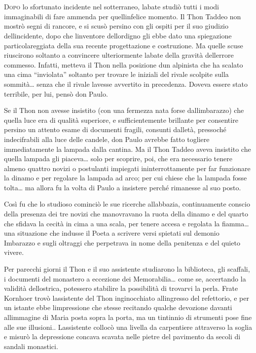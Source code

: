 	\chapter{\phantom{title}}

\lettrine{D}{opo} lo sfortunato incidente nel sotterraneo, l\textquotesingle abate
studiò tutti i modi immaginabili di fare ammenda per
quell\textquotesingle infelice momento. Il Thon Taddeo non mostrò segni
di rancore, e si scusò persino con gli ospiti per il suo giudizio
dell\textquotesingle incidente, dopo che l\textquotesingle inventore
dell\textquotesingle ordigno gli ebbe dato una spiegazione
particolareggiata della sua recente progettazione e costruzione. Ma
quelle scuse riuscirono soltanto a convincere ulteriormente
l\textquotesingle abate della gravità dell\textquotesingle errore
commesso. Infatti, metteva il Thon nella posizione d\textquotesingle un
alpinista che ha scalato una cima ``inviolata'' soltanto per trovare le
iniziali del rivale scolpite sulla sommità\ldots{} senza che il rivale
l\textquotesingle avesse avvertito in precedenza. Doveva essere stato
terribile, per lui, pensò don Paulo.

Se il Thon non avesse insistito (con una fermezza nata forse
dall\textquotesingle imbarazzo) che quella luce era di qualità
superiore, e sufficientemente brillante per consentire persino un
attento esame di documenti fragili, consunti dall\textquotesingle età,
pressoché indecifrabili alla luce delle candele, don Paulo avrebbe fatto
togliere immediatamente la lampada dalla cantina. Ma il Thon Taddeo
aveva insistito che quella lampada gli piaceva\ldots{} solo per
scoprire, poi, che era necessario tenere almeno quattro novizi o
postulanti impiegati ininterrottamente per far funzionare la dinamo e
per regolare la lampada ad arco; per cui chiese che la lampada fosse
tolta\ldots{} ma allora fu la volta di Paulo a insistere perché
rimanesse al suo posto.

Così fu che lo studioso cominciò le sue ricerche
all\textquotesingle abbazia, continuamente conscio della presenza dei
tre novizi che manovravano la ruota della dinamo e del quarto che
sfidava la cecità in cima a una scala, per tenere accesa e regolata la
fiamma\ldots{} una situazione che indusse il Poeta a scrivere versi
spietati sul demonio Imbarazzo e sugli oltraggi che perpetrava in nome
della penitenza e del quieto vivere.

Per parecchi giorni il Thon e il suo assistente studiarono la
biblioteca, gli scaffali, i documenti del monastero a eccezione dei
Memorabilia\ldots{} come se, accertando la validità
dell\textquotesingle ostrica, potessero stabilire la possibilità di
trovarvi la perla. Frate Kornhoer trovò l\textquotesingle assistente del
Thon inginocchiato all\textquotesingle ingresso del refettorio, e per un
istante ebbe l\textquotesingle impressione che stesse recitando qualche
devozione davanti all\textquotesingle immagine di Maria posta sopra la
porta, ma un tintinnio di strumenti pose fine alle sue illusioni..
L\textquotesingle assistente collocò una livella da carpentiere
attraverso la soglia e misurò la depressione concava scavata nelle
pietre del pavimento da secoli di sandali monastici.

